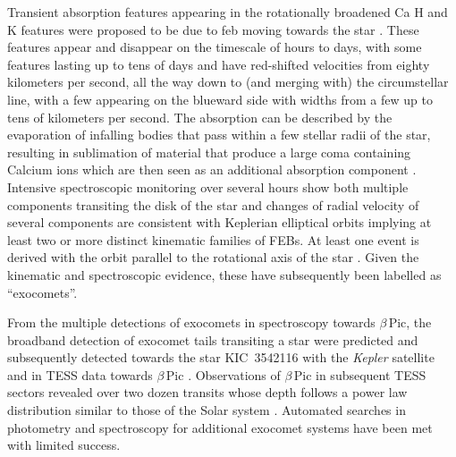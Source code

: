 \documentclass{aa}
\newcommand{\bp}{$\beta$\,Pic}
\begin{document}
Transient absorption features appearing in the rotationally broadened Ca H and K features were proposed to be due to \ac{feb} moving towards the star \citep{Ferlet87}.
%
These features appear and disappear on the timescale of hours to days, with some features lasting up to tens of days and have red-shifted velocities from eighty kilometers per second, all the way down to (and merging with) the circumstellar line, with a few appearing on the blueward side \citep{LagrangeHenri92} with widths from a few up to tens of kilometers per second.
%
The absorption can be described by the evaporation of infalling bodies that pass within a few stellar radii of the star, resulting in sublimation of material that produce a large coma containing Calcium ions which are then seen as an additional absorption component \citep{Beust91}.
%
Intensive spectroscopic monitoring over several hours show both multiple components transiting the disk of the star \citep{Beust96} and changes of radial velocity of several components are consistent with Keplerian elliptical orbits \citep{Kennedy18} implying at least two \citep{Kiefer14,Pollard24} or more \citep{Heller24} distinct kinematic families of FEBs.
%
At least one event is derived with the orbit parallel to the rotational axis of the star \citep{Tobin19}.
%
Given the kinematic and spectroscopic evidence, these have subsequently been labelled as ``exocomets''.

From the multiple detections of exocomets in spectroscopy towards \bp{}, the broadband detection of exocomet tails transiting a star were predicted \citep{LecavelierdesEtangs97} and subsequently detected towards the star KIC~3542116 \citep{Rappaport18} with the {\it Kepler} satellite \citep{Borucki10} and in TESS data towards \bp{} \citep{Zieba19}.
%
Observations of \bp{} in subsequent TESS sectors revealed over two dozen transits whose depth follows a power law distribution similar to those of the Solar system \citep{LecavelierdesEtangs22,Pavlenko22}.
%
Automated searches in photometry \citep{Kennedy19} and spectroscopy \citep{BendahanWest24} for additional exocomet systems have been met with limited success.
\end{document}

